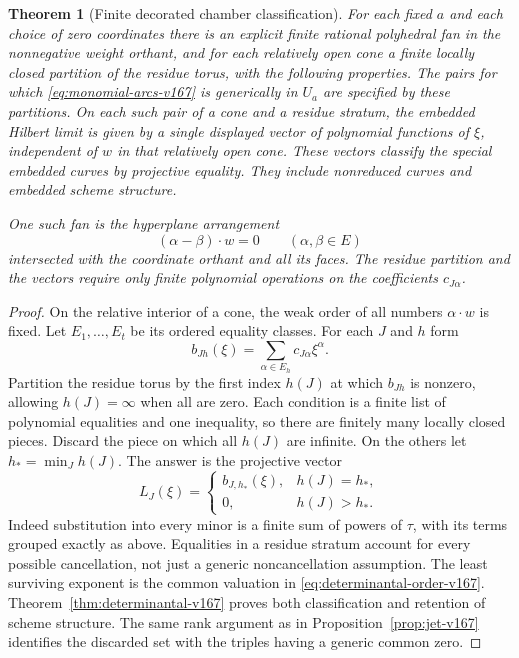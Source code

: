 \documentclass[11pt,reqno]{amsart}
\numberwithin{equation}{section}
\newtheorem{theorem}{Theorem}[section]
\theoremstyle{definition}\newtheorem{definition}[theorem]{Definition}
\theoremstyle{remark}\newtheorem{remark}[theorem]{Remark}
\begin{document}
\begin{theorem}[Finite decorated chamber classification]
\label{thm:finite-fan-v167}
For each fixed $a$ and each choice of zero coordinates there is an
explicit finite rational polyhedral fan in the nonnegative weight
orthant, and for each relatively open cone a finite locally closed
partition of the residue torus, with the following properties.
The pairs for which \eqref{eq:monomial-arcs-v167} is generically
in $U_a$ are specified by these partitions. On each such pair of
a cone and a residue stratum, the embedded Hilbert limit is given
by a single displayed vector of polynomial functions of $\xi$,
independent of $w$ in that relatively open cone. These vectors
classify the special embedded curves by projective equality.
They include nonreduced curves and embedded scheme structure.

One such fan is the hyperplane arrangement
\begin{equation}\label{eq:fan-v167}
              (\alpha-\beta)\cdot w=0\qquad(\alpha,\beta\in E)
\end{equation}
intersected with the coordinate orthant and all its faces.
The residue partition and the vectors require only finite
polynomial operations on the coefficients $c_{J\alpha}$.
\end{theorem}
\begin{proof}
On the relative interior of a cone, the weak order of all numbers
$\alpha\cdot w$ is fixed. Let $E_1,\ldots,E_t$ be its ordered
equality classes. For each $J$ and $h$ form
\[
 b_{Jh}(\xi)=\sum_{\alpha\in E_h}c_{J\alpha}\xi^\alpha.
\]
Partition the residue torus by the first index $h(J)$ at which
$b_{Jh}$ is nonzero, allowing $h(J)=\infty$ when all are zero.
Each condition is a finite list of polynomial equalities and one
inequality, so there are finitely many locally closed pieces.
Discard the piece on which all $h(J)$ are infinite. On the others
let $h_* =\min_J h(J)$. The answer is the projective vector
\begin{equation}\label{eq:decorated-vector-v167}
 L_J(\xi)=
 \begin{cases} b_{J,h_*}(\xi),&h(J)=h_*,\\0,&h(J)>h_*.
 \end{cases}
\end{equation}
Indeed substitution into every minor is a finite sum of powers of
$\tau$, with its terms grouped exactly as above. Equalities in a
residue stratum account for every possible cancellation, not just
a generic noncancellation assumption. The least surviving exponent
is the common valuation in \eqref{eq:determinantal-order-v167}.
Theorem~\ref{thm:determinantal-v167} proves both classification and
retention of scheme structure. The same rank argument as in
Proposition~\ref{prop:jet-v167} identifies the discarded set with
the triples having a generic common zero.
\end{proof}
\end{document}
